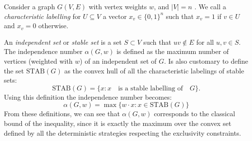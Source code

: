 \documentclass[letterpaper]{article}
\newcommand{\STAB}{\mathrm{STAB}}
\begin{document}
Consider a graph $G(V,E)$ with vertex weights $w$, and $|V| = n$ .
We call a \emph{characteristic labelling} for $U \subseteq V$ a vector $x_v \in
\{0,1\}^n$ such that $x_v = 1$ if $v \in U$ and $x_v = 0$ otherwise.

An \emph{independent set} or \emph{stable set} is a set
$S \subset V$ such that $uv \notin E$ for all $u,v \in S$.
The independence number $\alpha(G, w)$ is defined as the maximum number of
vertices (weighted with $w$) of an independent set of $G$. Is also customary to
define the set $\STAB(G)$ as the convex hull of all the
characteristic labelings of stable sets:
\begin{equation} 
    \STAB(G) = \{x : x \quad \text{is a stable labelling of}\quad G \}.
    \label{eq:stab}
\end{equation}
Using this definition the independence number becomes:
\begin{equation}
    \alpha(G,w) = \max\{w\cdot x: x \in \STAB(G)\}
    \label{eq:alphastab}
\end{equation}
From these definitions, we can see that $\alpha(G,w)$ corresponds to the classical bound of the inequality, since it is exactly the maximum over the convex set defined by all the deterministic strategies respecting the exclusivity constraints.
\end{document}
